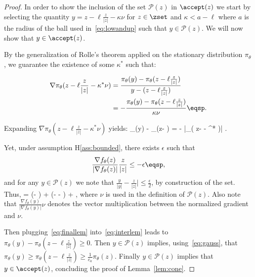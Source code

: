 \documentclass[letterpaper]{article} %
\begin{document}
\begin{proof}

In order to show the inclusion of the set $\mathcal{P}(z)$ in $\accept(z)$ we start by selecting the quantity $y = z- \ell \frac{z}{|z|} - \kappa \nu$ for $z\in \zset$ and $\kappa < a - \ell $ where $a$ is the radius of the ball used in~\eqref{eq:lowandup} such that $y \in \mathcal{P}(z)$.
We will now show that $y \in \accept(z)$.

By the generalization of Rolle's theorem applied on the stationary distribution $\pi_\theta$, we guarantee the existence of some $\kappa^*$ such that:

\begin{align}
\nabla \pi_\theta( z- \ell \frac{z}{|z|} - \kappa^* \nu) & = \frac{\pi_\theta(y) - \pi_\theta(z- \ell \frac{z}{|z|})}{y - (z- \ell \frac{z}{|z|})} \\
& = - \frac{\pi_\theta(y) - \pi_\theta(z- \ell \frac{z}{|z|})}{\kappa \nu} \eqsp.
\end{align}

Expanding $\nabla \pi_\theta( z- \ell \frac{z}{|z|} - \kappa^* \nu)$ yields:
\beq\label{eq:interlem}
\pi_\theta(y) - \pi_\theta(z- \ell {}) = - \kappa \nu {} |\nabla \pi_\theta( z- \ell {} - \kappa^* \nu)| \eqsp.
\eeq

Yet, under assumption H\ref{ass:bounded}, there exists $\epsilon$ such that 
$$
 \frac{\nabla f_{\theta}(z) }{|\nabla f_{\theta}(z) |}  \frac{z }{|z|} \leq -\epsilon \eqsp,
 $$
 and for any $y \in \mathcal{P}(z)$ we note that $\frac{y }{|y|} - \frac{z }{|z|}|\leq \frac{\epsilon}{2}$, by construction of the set.
 Thus, 
\beq\label{eq:finallem}
    \nu  =   (\nu - ) +   (\nu -  -  ) +     \eqsp,
\eeq
 where $\nu$ is used in the definition of $\mathcal{P}(z)$.
 Also note that $  \frac{\nabla f_{\theta}(y) }{|\nabla f_{\theta}(y) |}  \nu  $ denotes the vector multiplication between the normalized gradient and $\nu$.
 
Then plugging~\eqref{eq:finallem} into~\eqref{eq:interlem} leads to $\pi_\theta(y) - \pi_\theta(z- \ell \frac{z}{|z|}) \geq 0$.
Then $y \in \mathcal{P}(z)$ implies, using~\eqref{eq:gauss}, that $\pi_\theta(y) \geq \pi_\theta(z- \ell \frac{z}{|z|}) \geq \frac{1}{c_a} \pi_\theta(z)$. 
 Finally $y \in \mathcal{P}(z)$ implies that $y \in \accept(z)$, concluding the proof of Lemma~\ref{lem:cone}.
 
\end{proof}
\end{document}
